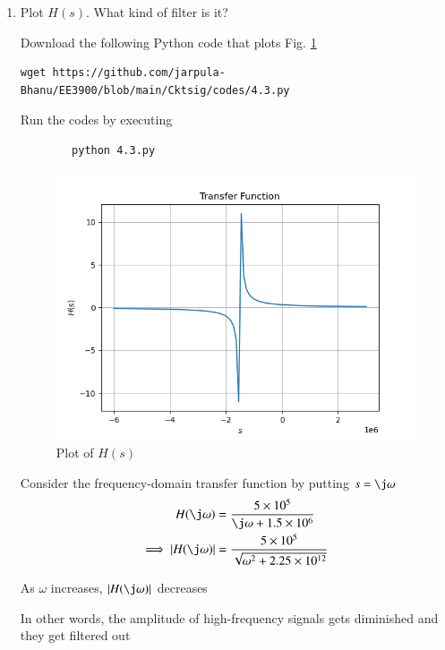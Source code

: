 \documentclass[journal,12pt,twocolumn]{IEEEtran}
\renewcommand\thesection{\arabic{section}}
\begin{document}
\begin{enumerate}[label=\thesection.\arabic*.,ref=\thesection.\theenumi]
            \item Plot $H(s)$.  What kind of filter is it?
            
            \solution Download the following Python code that plots Fig. \ref{fig-4.3}
            \begin{lstlisting}
wget https://github.com/jarpula-Bhanu/EE3900/blob/main/Cktsig/codes/4.3.py
            \end{lstlisting}
            
    Run the codes by executing
    \begin{lstlisting}
        python 4.3.py
    \end{lstlisting}	
    
    \begin{figure}[!ht]
        \centering
        \includegraphics[width=\columnwidth]{./figs/4.3.png}
        \caption{Plot of $H(s)$}
        \label{fig-4.3}	
    \end{figure}
    
    Consider the frequency-domain transfer function by putting $s = \j\omega$
    \begin{align}
        H(\j\omega) &= \frac{5 \times 10^5}{\j\omega + 1.5 \times 10^6} \\
        \implies \abs{H(\j\omega)} &= \frac{5 \times 10^5}{\sqrt{\omega^2 + 2.25\times10^{12}}}
    \end{align}
    
    As $\omega$ increases, $\abs{H(\j\omega)}$ decreases
    
    In other words, the amplitude of high-frequency signals gets diminished and they get filtered out
    

\end{enumerate}
\end{document}
